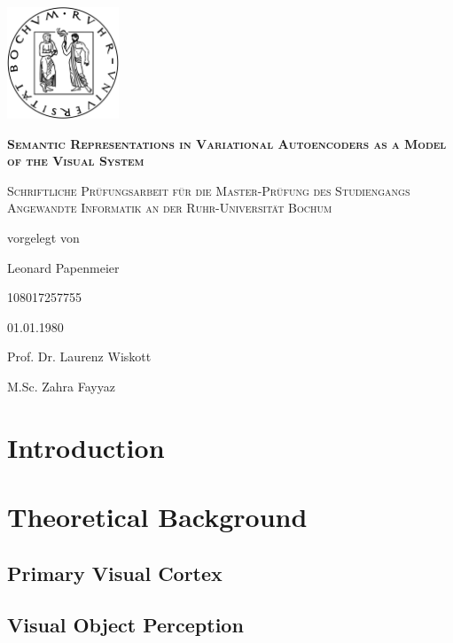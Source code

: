 \documentclass[11pt]{article}
\newcounter{savepage}
\begin{document}
    \begin{titlepage}
        \centering
        \includegraphics[width=0.25\textwidth]{rublogo.png}\par
        {\scshape\huge\bfseries Semantic Representations in Variational Autoencoders as a Model of the Visual System \par}
        {\scshape\large Schriftliche Prüfungsarbeit für die Master-Prüfung des Studiengangs Angewandte Informatik an der Ruhr-Universität Bochum\par}
        \vspace{1em}
        vorgelegt von\par
        \vspace{2em}
        Leonard Papenmeier\par 108017257755\par
        \vspace{2em}
        01.01.1980\par

        \vfill
        Prof. Dr. Laurenz Wiskott\par
        M.Sc. Zahra Fayyaz


    \end{titlepage}
    \tableofcontents
    \newpage


    \section{Introduction}\label{sec:introduction}


    \section{Theoretical Background}\label{sec:theoretical-background}

    \subsection{Primary Visual Cortex}\label{subsec:primary-visual-cortex}

    \subsection{Visual Object Perception}\label{subsec:visual-object-perception}
\end{document}
